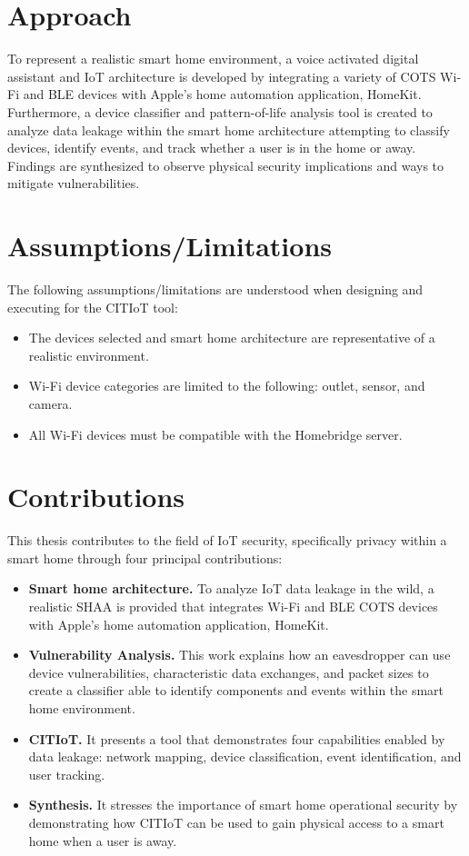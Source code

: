 \documentclass[12pt,letterpaper,oneside]{book}
\begin{document}
		\section{Approach}
		To represent a realistic smart home environment, a voice activated digital assistant and \ac{IoT} architecture is developed by integrating a variety of \ac{COTS} Wi-Fi and \ac{BLE} devices with Apple's home automation application, HomeKit. Furthermore, a device classifier and pattern-of-life analysis tool is created to analyze data leakage within the smart home architecture attempting to classify devices, identify events, and track whether a user is in the home or away. Findings are synthesized to observe physical security implications and ways to mitigate vulnerabilities.
		
		\section{Assumptions/Limitations}
		The following assumptions/limitations are understood when designing and executing for the \ac{CITIoT} tool:
		\begin{itemize}
			\item The devices selected and smart home architecture are representative of a realistic environment.
			\item Wi-Fi device categories are limited to the following: outlet, sensor, and camera.
			\item All Wi-Fi devices must be compatible with the Homebridge server.
		\end{itemize}
		
		\section{Contributions}
		This thesis contributes to the field of \ac{IoT} security, specifically privacy within a smart home through four principal contributions:
		\begin{itemize}
			\item \textbf{Smart home architecture.} To analyze \ac{IoT} data leakage in the wild, a realistic \acf{SHAA} is provided that integrates Wi-Fi and \ac{BLE} \ac{COTS} devices with Apple's home automation application, HomeKit.
			\item \textbf{Vulnerability Analysis.} This work explains how an eavesdropper can use device vulnerabilities, characteristic data exchanges, and packet sizes to create a classifier able to identify components and events within the smart home environment.
			\item \textbf{\acf{CITIoT}.} It presents a tool that demonstrates four capabilities enabled by data leakage: network mapping, device classification, event identification, and user tracking.
			\item \textbf{Synthesis.} It stresses the importance of smart home operational security by demonstrating how \ac{CITIoT} can be used to gain physical access to a smart home when a user is away.
		\end{itemize}
		
\end{document}
